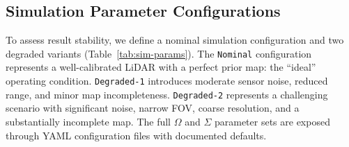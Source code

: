 \documentclass[conference]{IEEEtran}
\begin{document}
\subsection{Simulation Parameter Configurations}
\label{sec:sim-configs}
To assess result stability, we define a nominal simulation configuration and two degraded variants (Table~\ref{tab:sim-params}).
The \texttt{Nominal} configuration represents a well-calibrated LiDAR with a perfect prior map: the ``ideal'' operating condition. \texttt{Degraded-1} introduces moderate sensor noise, reduced range, and minor map incompleteness. \texttt{Degraded-2} represents a challenging scenario with significant noise, narrow FOV, coarse resolution, and a substantially incomplete map. The full $\Omega$ and $\Sigma$ parameter sets are exposed through YAML configuration files with documented defaults.
\end{document}
